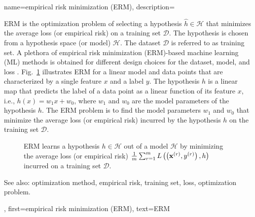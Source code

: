 {
{name={empirical risk minimization (ERM)}, 
	description={ERM is the optimization problem of 
	selecting a hypothesis $\hat{h} \in \mathcal{H}$ that minimizes the 
	average loss (or empirical risk) on a training set $\mathcal{D}$. 
	The hypothesis is chosen from a hypothesis space (or model) $\mathcal{H}$. 
	The dataset $\mathcal{D}$ is referred to as training set. A plethora of empirical risk minimization (ERM)-based 
	machine learning (ML) methods is obtained for different design choices for the dataset, model, 
	and loss \cite[Ch. 3]{MLBasics}. Fig.\ \ref{fig_erm_dict} illustrates ERM for a linear model 
	and data points that are characterized by a single feature $x$ and a label $y$. 
	The hypothesis $h$ is a linear map that predicts the label 
	of a data point as a linear function of its feature $x$, i.e., 
		$h(x) = w_{1} x + w_{0}$, where $w_{1}$ 
	and $w_{0}$ are the model parameters of the hypothesis $h$. 
	The ERM problem is to find the model parameters $w_{1}$ and $w_{0}$ that 
	minimize the average loss (or empirical risk) incurred by the hypothesis 
	$h$ on the training set $\mathcal{D}$.
    \begin{figure}[H]
\begin{center}
\caption{ERM learns a hypothesis $h \in \mathcal{H}$ 
out of a model $\mathcal{H}$ by minimizing the average loss 
(or empirical risk) $\frac{1}{m} \sum_{r=1}^m L\left(\left( {\bf x}^{(r)}, y^{(r)} \right),h \right)$ incurred on a training set $\mathcal{D}$.}
\label{fig_erm_dict}
\end{center}
\end{figure}
		See also: optimization method, empirical risk, training set, loss, optimization problem.},
	first={empirical risk minimization (ERM)},
	text={ERM} 
}


}
